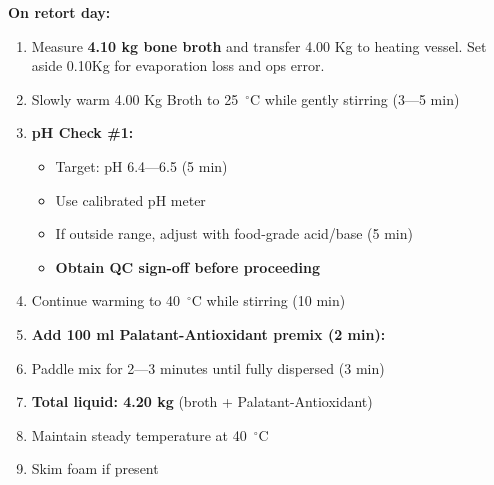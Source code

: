 \textbf{On retort day:}
\begin{enumerate}[resume,leftmargin=1.5em]
\textbf{Log Start Time in Timesheet:} \_\_\_\_\_ 
\item Measure \textbf{4.10 kg bone broth} and transfer 4.00 Kg to heating vessel. Set aside 0.10Kg for evaporation loss and ops error.
\item Slowly warm 4.00 Kg Broth to 25~$^\circ$C while gently stirring (3---5 min)
\item \textbf{pH Check \#1:}
  \begin{itemize}
  \item Target: pH 6.4---6.5 (5 min)
  \item Use calibrated pH meter
  \item If outside range, adjust with food-grade acid/base (5 min)
  \item \textbf{Obtain QC sign-off before proceeding}
  \end{itemize}
\item Continue warming to 40~$^\circ$C while stirring (10 min)
\item \textbf{Add 100 ml Palatant-Antioxidant premix (2 min):}
  
  
\item Paddle mix for 2---3 minutes until fully dispersed (3 min)
\item \textbf{Total liquid: 4.20 kg} (broth + Palatant-Antioxidant)
\item Maintain steady temperature at 40~$^\circ$C
\item Skim foam if present 
\end{enumerate}


